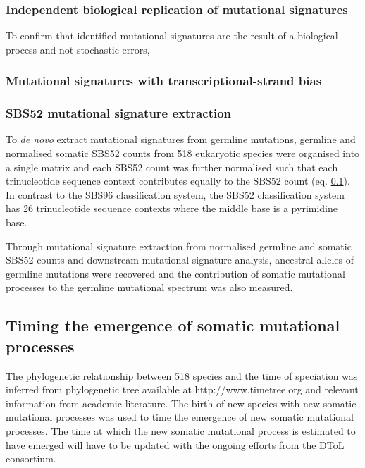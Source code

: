 \subsubsection{Independent biological replication of mutational signatures}

To confirm that identified mutational signatures are the result of a biological process and not stochastic errors,

\subsubsection{Mutational signatures with transcriptional-strand bias}



\subsubsection{SBS52 mutational signature extraction}

To \textit{de novo} extract mutational signatures from germline mutations, germline and normalised somatic SBS52 counts from 518 eukaryotic species were organised into a single matrix and each SBS52 count was further normalised such that each trinucleotide sequence context contributes equally to the SBS52 count (eq. \ref{}). In contrast to the SBS96 classification system, the SBS52 classification system has 26 trinucleotide sequence contexts where the middle base is a pyrimidine base. 

Through mutational signature extraction from normalised germline and somatic SBS52 counts and downstream mutational signature analysis, ancestral alleles of germline mutations were recovered and the contribution of somatic mutational processes to the germline mutational spectrum was also measured. 

\subsection{Timing the emergence of somatic mutational processes}

The phylogenetic relationship between 518 species and the time of speciation was inferred from phylogenetic tree available at http://www.timetree.org and relevant information from academic literature. The birth of new species with new somatic mutational processes was used to time the emergence of new somatic mutational processes. The time at which the new somatic mutational process is estimated to have emerged will have to be updated with the ongoing efforts from the DToL consortium.  


